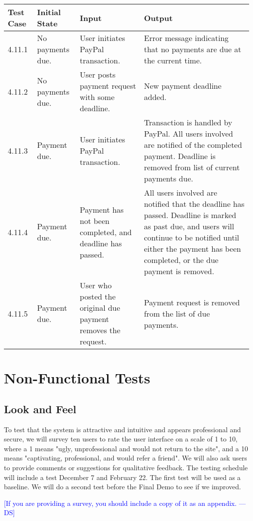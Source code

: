 \documentclass[12pt]{article}
\newcommand{\authornote}[3]{\textcolor{#1}{[#3 ---#2]}}
\newcommand{\authornote}[3]{}
\newcommand{\ds}[1]{\authornote{blue}{DS}{#1}}
\begin{document}
\begin{longtable}{|p{2cm}|p{3cm}|p{5cm}|p{5cm}|}
\hline
\textbf{Test Case} & \textbf{Initial State} & \textbf{Input} & \textbf{Output} \\ \hline
4.11.1 & No payments due. & User initiates PayPal transaction. & Error message indicating that no payments are due at the current time.\\
\hline
4.11.2 & No payments due. & User posts payment request with some deadline. & New payment deadline added.\\
\hline
4.11.3 & Payment due. & User initiates PayPal transaction. & Transaction is handled by PayPal. All users involved are notified of the completed payment. Deadline is removed from list of current payments due.\\
\hline
4.11.4 & Payment due. & Payment has not been completed, and deadline has passed. & All users involved are notified that the deadline has passed. Deadline is marked as past due, and users will continue to be notified until either the payment has been completed, or the due payment is removed.\\
\hline
4.11.5 & Payment due. & User who posted the original due payment removes the request. & Payment request is removed from the list of due payments.\\
\hline
\end{longtable}


\section{Non-Functional Tests}

\subsection{Look and Feel}
To test that the system is attractive and intuitive and appears professional and secure, we will survey ten users to rate the user interface on a scale of 1 to 10, where a 1 means "ugly, unprofessional and would not return to the site", and a 10 means "captivating, professional, and would refer a friend". We will also ask users to provide comments or suggestions for qualitative feedback. The testing schedule will include a test December 7 and February 22. The first test will be used as a baseline. We will do a second test before the Final Demo to see if we improved.

\ds{If you are providing a survey, you should include a copy of it as an appendix.}
\end{document}
